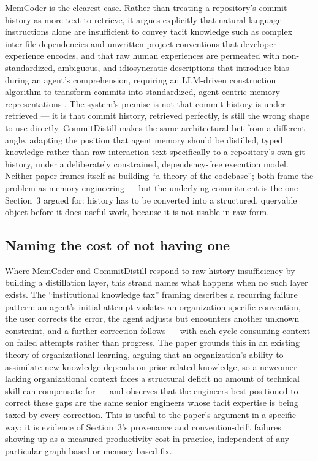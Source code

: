 \documentclass[11pt]{article}
\begin{document}
MemCoder is the clearest case. Rather than treating a repository's commit history as more text to retrieve, it argues explicitly that natural language instructions alone are insufficient to convey tacit knowledge such as complex inter-file dependencies and unwritten project conventions that developer experience encodes, and that raw human experiences are permeated with non-standardized, ambiguous, and idiosyncratic descriptions that introduce bias during an agent's comprehension, requiring an LLM-driven construction algorithm to transform commits into standardized, agent-centric memory representations \citep{memcoder2026}. The system's premise is not that commit history is under-retrieved --- it is that commit history, retrieved perfectly, is still the wrong shape to use directly. CommitDistill makes the same architectural bet from a different angle, adapting the position that agent memory should be distilled, typed knowledge rather than raw interaction text \citep{commitdistill2026} specifically to a repository's own git history, under a deliberately constrained, dependency-free execution model. Neither paper frames itself as building ``a theory of the codebase''; both frame the problem as memory engineering --- but the underlying commitment is the one Section~3 argued for: history has to be converted into a structured, queryable object before it does useful work, because it is not usable in raw form.

\subsection{Naming the cost of not having one}

Where MemCoder and CommitDistill respond to raw-history insufficiency by building a distillation layer, this strand names what happens when no such layer exists. The ``institutional knowledge tax'' framing describes a recurring failure pattern: an agent's initial attempt violates an organization-specific convention, the user corrects the error, the agent adjusts but encounters another unknown constraint, and a further correction follows \citep{knowledgeactivation2026} --- with each cycle consuming context on failed attempts rather than progress. The paper grounds this in an existing theory of organizational learning, arguing that an organization's ability to assimilate new knowledge depends on prior related knowledge, so a newcomer lacking organizational context faces a structural deficit no amount of technical skill can compensate for \citep{cohenlevinthal1990} --- and observes that the engineers best positioned to correct these gaps are the same senior engineers whose tacit expertise is being taxed by every correction. This is useful to the paper's argument in a specific way: it is evidence of Section~3's provenance and convention-drift failures showing up as a measured productivity cost in practice, independent of any particular graph-based or memory-based fix.
\end{document}
